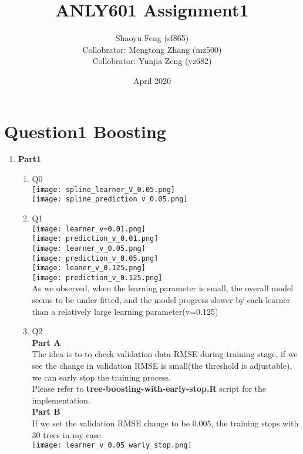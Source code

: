 \documentclass{article}
\title{ANLY601 Assignment1}
\author{Shaoyu Feng (sf865) \\
Collobrator: Mengtong Zhang (mz500) \\
Collobrator: Yunjia Zeng (yz682)
}
\date{April 2020}
\begin{document}
\maketitle

\section{Question1 Boosting} 
\begin{enumerate}
\item \textbf{Part1} \\
\begin{enumerate}
\item Q0\\
\texttt{[image: spline\_learner\_V\_0.05.png]}\\
\texttt{[image: spline\_prediction\_v\_0.05.png]}\\
\item Q1 \\
\texttt{[image: learner\_v=0.01.png]}\\
\texttt{[image: prediction\_v\_0.01.png]}\\
\texttt{[image: learner\_v\_0.05.png]}\\
\texttt{[image: prediction\_v\_0.05.png]}\\
\texttt{[image: leaner\_v\_0.125.png]}\\
\texttt{[image: prediction\_v\_0.125.png]}\\

As we observed, when the learning parameter is small, the overall model seems to be under-fitted, and the model progress slower by each learner than a relatively large learning parameter(v=0.125) \\

\item Q2 \\
\textbf{Part A} \\
The idea is to to check validation data RMSE during training stage, if we see the change in validation RMSE is small(the threshold is adjustable), we can early stop the training process. \\
Please refer to \textbf{tree-boosting-with-early-stop.R} script for the implementation. \\
\textbf{Part B} \\
If we set the validation RMSE change to be 0.005, the training stops with 30 trees in my case.\\ 
\texttt{[image: learner\_v\_0.05\_warly\_stop.png]}\\


\end{enumerate}
\end{enumerate}
\end{document}
